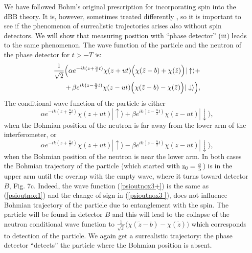 \documentclass[12pt,preprint,tightenlines]{elsarticle}
\begin{document}
We have followed Bohm's original prescription for incorporating spin
into the dBB theory. It is, however, sometimes treated differently \cite{DewdneyHKV},
 so it is important to see if the phenomenon of surrealistic trajectories
arises also without spin detectors. We will show that measuring position
with ``phase detector'' (iii) leads to the same phenomenon. The
wave function of the particle and the neutron of the phase detector
for $t>-T$ is:
 \begin{equation}
 \begin{split}
\frac{1}{\sqrt{2}}\Bigl(\alpha e^{-ik(z+\frac{u}{2}t)}\chi(z+ut)\Big(\chi(\tilde{z}-b) +
\chi(\tilde{z})\Big )|\uparrow\rangle+ \\
+ \, \beta e^{ik(z-\frac{u}{2}t)}\chi(z-ut)\Big(\chi(\tilde{z}-b)-\chi(\tilde{z})\Big )|\downarrow\rangle\Bigr),\label{psioutnox3}
\end{split}
\end{equation}
 The conditional wave function of the particle is either
  \begin{equation}
\alpha e^{-ik(z+\frac{u}{2}t)}\chi(z+ut)|\uparrow\rangle+\beta e^{ik(z-\frac{u}{2}t)}\chi(z-ut)|\downarrow\rangle,\label{psioutnox3+}
\end{equation}
 when the Bohmian position of the neutron is far away from the lower arm of the interferometer, or
  \begin{equation}
\alpha e^{-ik(z+\frac{u}{2}t)}\chi(z+ut)|\uparrow\rangle-\beta e^{ik(z-\frac{u}{2}t)}\chi(z-ut)|\downarrow\rangle,\label{psioutnox3-}
\end{equation}
 when the Bohmian position of the neutron is near the lower arm. In both cases
the Bohmian trajectory of the particle (which started with ${\rm z_{0}}=\frac{a}{5}$)
is in the upper arm  until the overlap with the empty wave, where it turns
toward detector $B$, Fig. 7c. Indeed, the wave function (\ref{psioutnox3+})
is the same as (\ref{psioutnox1}) and the change of sign in (\ref{psioutnox3-}),
does not influence Bohmian trajectory of the particle due to entanglement
with the spin. The particle will be found in detector $B$ and this
will lead to the collapse of the neutron conditional
wave function  to $ \frac{1}{\sqrt{2}}\Big(\chi(\tilde{z}-b)-\chi(\tilde{z})\Big)$
which corresponds to detection of the particle. We again get a surrealistic
trajectory: the phase detector ``detects'' the particle where
the Bohmian position is absent.
\end{document}
